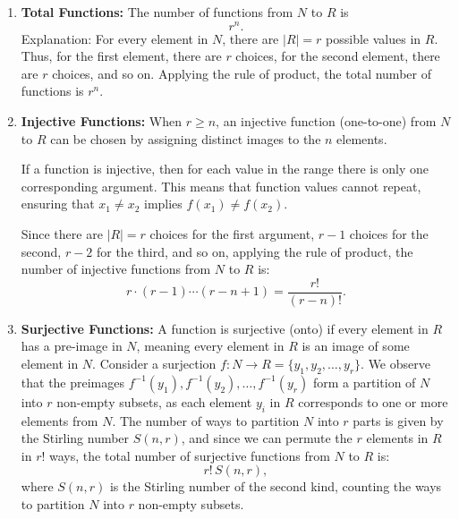 \documentclass{article}
\begin{document}
\begin{enumerate}[label=(\roman*)]
    \item \textbf{Total Functions:}  
    The number of functions from \( N \) to \( R \) is  
    \[
    r^n.
    \]  
    Explanation: For every element in \( N \), there are \( |R| = r \) possible values in \( R \). Thus, for the first element, there are \( r \) choices, for the second element, there are \( r \) choices, and so on.  
    Applying the rule of product, the total number of functions is \( r^n \).

    \item \textbf{Injective Functions:}  
    When \( r \geq n \), an injective function (one-to-one) from \( N \) to \( R \) can be chosen by assigning distinct images to the \( n \) elements.  

    If a function is injective, then for each value in the range there is only one corresponding argument. This means that function values cannot repeat, ensuring that \( x_1 \neq x_2 \) implies \( f(x_1) \neq f(x_2) \).  

    Since there are \( |R| = r \) choices for the first argument, \( r-1 \) choices for the second, \( r-2 \) for the third, and so on, applying the rule of product, the number of injective functions from \( N \) to \( R \) is:  
    \[
    r \cdot (r-1) \cdots (r-n+1) = \frac{r!}{(r-n)!}.
    \]
    \item \textbf{Surjective Functions:}  
    A function is surjective (onto) if every element in \( R \) has a pre-image in \( N \), meaning every element in \( R \) is an image of some element in \( N \).  
    Consider a surjection \( f: N \to R = \{y_1, y_2, \dots, y_r\} \). We observe that the preimages \( f^{-1}(y_1), f^{-1}(y_2), \dots, f^{-1}(y_r) \) form a partition of \( N \) into \( r \) non-empty subsets, as each element \( y_i \) in \( R \) corresponds to one or more elements from \( N \).  
    The number of ways to partition \( N \) into \( r \) parts is given by the Stirling number \( S(n, r) \), and since we can permute the \( r \) elements in \( R \) in \( r! \) ways, the total number of surjective functions from \( N \) to \( R \) is:  
    \[
    r! \, S(n, r),
    \]
    where \( S(n, r) \) is the Stirling number of the second kind, counting the ways to partition \( N \) into \( r \) non-empty subsets.

\end{enumerate}
\end{document}
